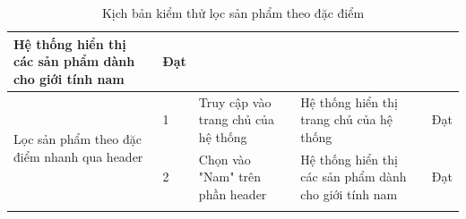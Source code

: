 {\begin{longtable}{| p{2.5cm}| p{1cm}| p{5.5cm}| p{4.5cm} | p{1.5cm} |}
        Hệ thống hiển thị các sản phẩm dành cho giới tính nam                          &
        Đạt                                                                                                                                                                           \\
        \hline
        \multirow[t]{2}{2.5cm}{Lọc sản phẩm theo đặc điểm nhanh qua header}            &
        1                                                                              &
        Truy cập vào trang chủ của hệ thống                                            &
        Hệ thống hiển thị trang chủ của hệ thống                                       &
        Đạt                                                                                                                                                                           \\
        \cline{2-5}
                                                                                       & 2                  &
        Chọn vào "Nam" trên phần header                                                &
        Hệ thống hiển thị các sản phẩm dành cho giới tính nam                          &
        Đạt                                                                                                                                                                           \\
        \hline
        \caption{Kịch bản kiểm thử lọc sản phẩm theo đặc điểm}
    \end{longtable}
}

